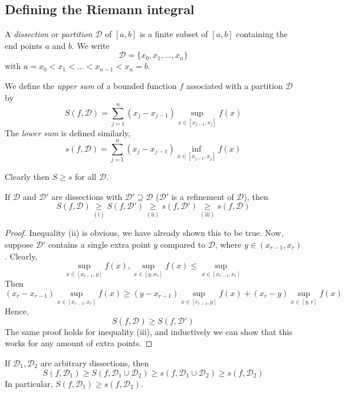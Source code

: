 \subsection{Defining the Riemann integral}
\begin{definition}
	A \textit{dissection} or \textit{partition} \(\mathcal D\) of \([a, b]\) is a finite subset of \([a, b]\) containing the end points \(a\) and \(b\).
	We write
	\[
		\mathcal D = \{ x_0, x_1, \dots, x_n \}
	\]
	with \(a = x_0 < x_1 < \dots < x_{n-1} < x_n = b\).
\end{definition}
\begin{definition}
	We define the \textit{upper sum} of a bounded function \(f\) associated with a partition \(\mathcal D\) by
	\[
		S(f, \mathcal D) = \sum_{j=1}^n (x_j - x_{j-1}) \sup_{x \in [x_{j-1}, x_j]} f(x)
	\]
	The \textit{lower sum} is defined similarly,
	\[
		s(f, \mathcal D) = \sum_{j=1}^n (x_j - x_{j-1}) \inf_{x \in [x_{j-1}, x_j]} f(x)
	\]
\end{definition}
Clearly then \(S \geq s\) for all \(\mathcal D\).
\begin{lemma}
	If \(\mathcal D\) and \(\mathcal D'\) are dissections with \(\mathcal D' \supseteq \mathcal D\) (\(\mathcal D'\) is a refinement of \(\mathcal D\)), then
	\[
		S(f, \mathcal D) \underset{(\mathrm{i})}{\geq} S(f, \mathcal D') \underset{(\mathrm{ii})}{\geq} s(f, \mathcal D') \underset{(\mathrm{iii})}{\geq} s(f, \mathcal D)
	\]
\end{lemma}
\begin{proof}
	Inequality (ii) is obvious, we have already shown this to be true.
	Now, suppose \(\mathcal D'\) contains a single extra point \(y\) compared to \(\mathcal D\), where \(y \in (x_{r-1}, x_r)\).
	Clearly,
	\[
		\sup_{x \in [x_{r-1}, y]} f(x), \sup_{x \in [y, x_r]} f(x) \leq \sup_{x \in [x_{r-1}, x_r]}
	\]
	Then
	\[
		(x_r - x_{r-1}) \sup_{x \in [x_{r-1}, x_r]} f(x) \geq (y-x_{r-1}) \sup_{x \in [r_{r-1}, y]} f(x) + (x_r - y) \sup_{x \in [y, r]} f(x)
	\]
	Hence,
	\[
		S(f, \mathcal D) \geq S(f, \mathcal D')
	\]
	The same proof holds for inequality (iii), and inductively we can show that this works for any amount of extra points.
\end{proof}
\begin{lemma}
	If \(\mathcal D_1, \mathcal D_2\) are arbitrary dissections, then
	\[
		S(f, \mathcal D_1) \geq S(f, \mathcal D_1 \cup \mathcal D_2) \geq s(f, \mathcal D_1 \cup \mathcal D_2) \geq s(f, \mathcal D_2)
	\]
	In particular, \(S(f, \mathcal D_1) \geq s(f, \mathcal D_2)\).
\end{lemma}
